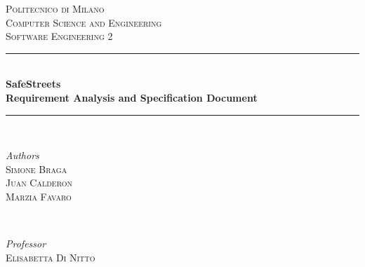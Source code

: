 \documentclass[./main.tex]{subfiles}
\begin{document}

\begin{titlepage}
	\newcommand{\HRule}{\rule{\linewidth}{0.5mm}}
	
	\center
	
	
	\textsc{\LARGE Politecnico di Milano}\\[1.5cm]
	
	\textsc{\Large Computer Science and Engineering}\\[0.5cm]
	
	\textsc{\large Software Engineering 2}\\[0.5cm]
	
	
	\HRule\\[0.4cm]
	
	{\huge\bfseries SafeStreets\medskip\\
	\normalsize Requirement Analysis and Specification Document}\\[0.4cm]
	
	\HRule\\[1.5cm]
	
	
	\begin{minipage}{0.4\textwidth}
		\begin{flushleft}
			\large
			\textit{Authors}\\
			\textsc{Simone Braga}\\
			\textsc{Juan Calderon}\\
			\textsc{Marzia Favaro}
		\end{flushleft}
	\end{minipage}
	~
	\begin{minipage}{0.4\textwidth}
		\begin{flushright}
			\large
			\textit{Professor}\\
			\textsc{Elisabetta Di Nitto}\linebreak\linebreak
		\end{flushright}
	\end{minipage}
	

\end{titlepage}
\end{document}
